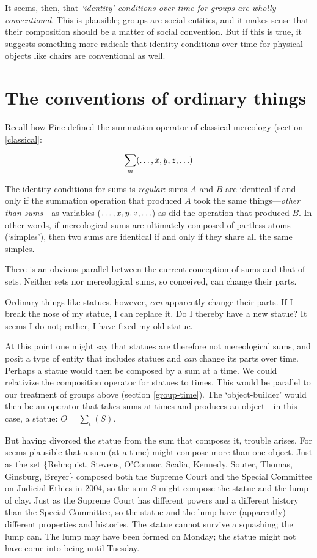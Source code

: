 \documentclass[11pt]{article}
\begin{document}
\begin{spacing}{1.5}
It seems, then, that {\em `identity' conditions over time for groups
  are wholly conventional}.  This is plausible; groups are social
entities, and it makes sense that their composition should be a matter
of social convention.  But if this is true, it suggests something more
radical: that identity conditions over time for physical objects like
chairs are conventional as well.

\section{The conventions of ordinary things}
Recall how Fine defined the summation operator of classical
mereology (section \ref{classical}:

\begin{displaymath}
\sum _m (\mathellipsis , x, y, z, \mathellipsis )
\end{displaymath}

The identity conditions for sums is {\em regular}: sums $A$ and $B$
are identical if and only if the summation operation that produced $A$
took the same things---{\em other than sums}---as variables
($\mathellipsis , x, y, z, \mathellipsis $) as did the operation that
produced $B$.  In other words, if mereological sums are ultimately
composed of partless atoms (`simples'), then two sums are identical if
and only if they share all the same simples.

There is an obvious parallel between the current conception of sums
and that of sets.  Neither sets nor mereological sums, so conceived,
can change their parts.

Ordinary things like statues, however, {\em can} apparently change
their parts.  If I break the nose of my statue, I can replace it.  Do
I thereby have a new statue?  It seems I do not; rather, I have fixed
my old statue.

At this point one might say that statues are therefore not
mereological sums, and posit a type of entity that includes statues
and {\em can} change its parts over time.  Perhaps a statue would then
be composed by a sum at a time.  We could relativize the composition
operator for statues to times.  This would be parallel to our
treatment of groups above (section \ref{group-time}).  The
`object-builder' would then be an operator that takes sums at times
and produces an object---in this case, a statue: $O = \sum _{t} ( S
)$.

But having divorced the statue from the sum that composes it, trouble
arises.  For seems plausible that a sum (at a time) might compose more
than one object.  Just as the set \{Rehnquist, Stevens, O'Connor,
Scalia, Kennedy, Souter, Thomas, Ginsburg, Breyer\} composed both the
Supreme Court and the Special Committee on Judicial Ethics in 2004, so
the sum $S$ might compose the statue and the lump of clay.  Just as
the Supreme Court has different powers and a different history than
the Special Committee, so the statue and the lump have (apparently)
different properties and histories.  The statue cannot survive a
squashing; the lump can.  The lump may have been formed on Monday; the
statue might not have come into being until Tuesday.


\end{spacing}
\end{document}
